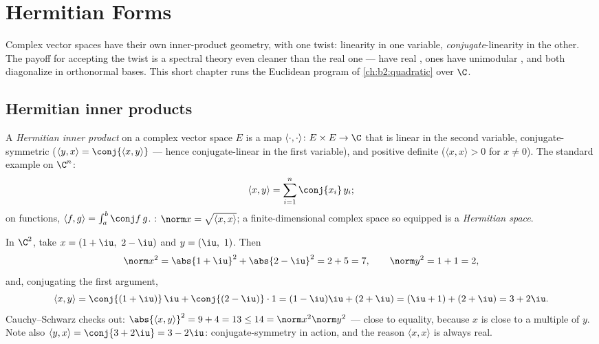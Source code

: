 \chapter{Hermitian Forms}\label{ch:b2:hermitian}

Complex vector spaces have their own inner-product geometry, with
one twist: linearity in one variable, \emph{conjugate}-linearity in
the other. The payoff for accepting the twist is a spectral theory
even cleaner than the real one ---  have real
,  ones have unimodular , and both
diagonalize in orthonormal bases. This short chapter runs the
Euclidean program of \cref{ch:b2:quadratic} over $\C$.

\section{Hermitian inner products}

\begin{definition}\label{def:b2:hermitian:def}
A \emph{Hermitian inner product} on
a complex vector space $E$ is a map $\langle\cdot,\cdot\rangle
\colon E \times E \to \C$ that is linear in the second variable,
conjugate-symmetric ($\langle y, x\rangle = \conj{\langle x,
y\rangle}$ --- hence conjugate-linear in the first variable), and
positive definite ($\langle x, x\rangle > 0$ for $x \neq 0$). The
standard example on $\C^n$:
\[
\langle x, y \rangle = \sum_{i=1}^{n} \conj{x_i}\, y_i ;
\]
on  functions, $\langle f, g\rangle = \int_a^b \conj
f\,g$. : $\norm x = \sqrt{\langle x,x\rangle}$; a
finite-dimensional complex space so equipped is a \emph{Hermitian
space}.
\end{definition}

\begin{example}\label{ex:b2:hermitian:firstcomp}
In $\C^2$, take $x = (1+\iu,\ 2-\iu)$ and $y = (\iu,\ 1)$.
Then
\[
\norm x^2 = \abs{1+\iu}^2 + \abs{2-\iu}^2 = 2 + 5 = 7,
\qquad
\norm y^2 = 1 + 1 = 2,
\]
and, conjugating the first argument,
\[
\langle x, y\rangle
= \conj{(1+\iu)}\,\iu + \conj{(2-\iu)}\cdot1
= (1-\iu)\iu + (2+\iu)
= (\iu + 1) + (2 + \iu) = 3 + 2\iu .
\]
Cauchy--Schwarz checks out: $\abs{\langle x, y\rangle}^2 = 9 +
4 = 13 \leq 14 = \norm x^2\norm y^2$ --- close to equality,
because $x$ is close to a multiple of $y$. Note also
$\langle y, x\rangle = \conj{3 + 2\iu} = 3 - 2\iu$:
conjugate-symmetry in action, and the reason $\langle x,
x\rangle$ is always real.
\end{example}

